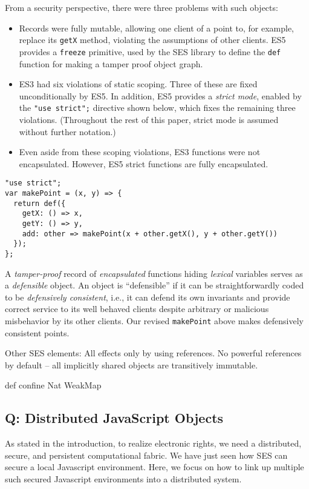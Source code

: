 \documentclass{llncs}
\begin{document}
From a security perspective, there were three problems with such objects: 
\begin{itemize}
\item Records were fully mutable, allowing one client of a point to, for example, replace its {\tt getX} method, violating the assumptions of other clients. ES5 provides a {\tt freeze} primitive, used by the SES library to define the {\tt def} function for making a tamper proof object graph.
\item ES3 had six violations of static scoping. Three of these are fixed unconditionally by ES5. In addition, ES5 provides a \emph{strict mode}, enabled by the {\tt "use strict";} directive shown below, which fixes the remaining three violations. (Throughout the rest of this paper, strict mode is assumed without further notation.)  
\item Even aside from these scoping violations, ES3 functions were not encapsulated. However, ES5 strict functions are fully encapsulated.
\end{itemize}

\begin{verbatim}
"use strict";
var makePoint = (x, y) => {
  return def({
    getX: () => x,
    getY: () => y,
    add: other => makePoint(x + other.getX(), y + other.getY())
  });
};
\end{verbatim}

A \emph{tamper-proof} record of \emph{encapsulated} functions hiding \emph{lexical} variables serves as a \emph{defensible} object. An object is ``defensible'' if it can be straightforwardly coded to be \emph{defensively consistent}\cite{RobustComposition}, i.e., it can defend its own invariants and provide correct service to its well behaved clients despite arbitrary or malicious misbehavior by its other clients. Our revised {\tt makePoint} above makes defensively consistent points.

Other SES elements: 
All effects only by using references.
No powerful references by default -- all implicitly shared objects are transitively immutable. 

def
confine
Nat
WeakMap

\subsection{Q: Distributed JavaScript Objects}

As stated in the introduction, to realize electronic rights, we need a distributed, secure, and persistent computational fabric. We have just seen how SES can secure a local Javascript environment. Here, we focus on how to link up multiple such secured Javascript environments into a distributed system.
\end{document}
